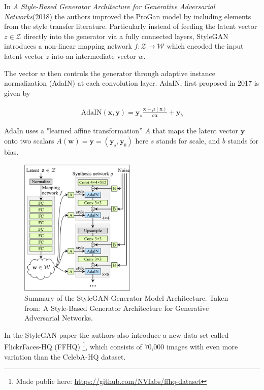 In \textit{A Style-Based Generator Architecture for Generative Adversarial Networks}(2018)\cite{stylegan} the authors improved the ProGan model by including elements from the style transfer literature. Particularly instead of feeding the latent vector $z\in\mathcal{Z}$ directly into the generator via a fully connected layers, StyleGAN introduces a non-linear mapping network $f:\mathcal{Z}\to\mathcal{W}$ which encoded the input latent vector $z$ into an intermediate vector $w$.

The vector $w$ then controls the generator through adaptive instance normalization (AdaIN) at each convolution layer.
AdaIN, first proposed in 2017 \cite{adain} is given by

\begin{align}
  \text{AdaIN}(\mathbf{x},\mathbf{y}) = \mathbf{y}_s \frac{\mathbf{x}-\mu(\mathbf{x})}{\sigma{\mathbf{x}}}+\mathbf{y}_b
\end{align}

AdaIn uses a "learned affine transformation” $A$ that maps the latent  vector $\mathbf{y}$ onto two scalars $A(\mathbf{w})= \mathbf{y}=(\mathbf{y}_s,\mathbf{y}_b)$ here $s$ stands for scale, and $b$ stands for bias.


  \begin{figure}
  \includegraphics[width=5.5cm]{fig/stylegan-arch}
  \caption{Summary of the StyleGAN Generator Model Architecture.
  Taken from: A Style-Based Generator Architecture for Generative Adversarial Networks.\cite{stylegan}}
  \label{stylegan-arch}
  \end{figure}



In the StyleGAN paper the authors also introduce a new data set called FlickrFaces-HQ (FFHQ) \footnote{Made public here: \url{https://github.com/NVlabs/ffhq-dataset}}, which consists of 70,000 images with even more variation than the CelebA-HQ dataset.\cite{stylegan}


